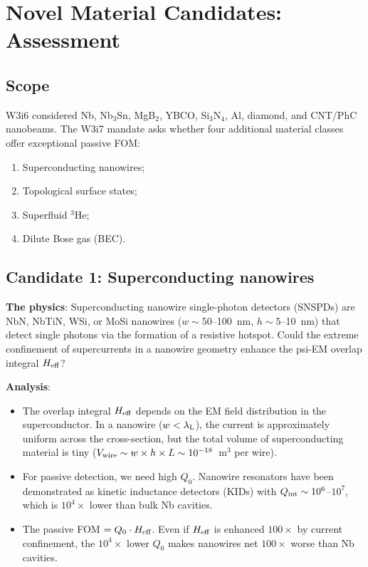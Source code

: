 \documentclass[11pt]{article}
\theoremstyle{definition}
\theoremstyle{remark}
\newcommand{\lambdaL}{\lambda_{\rm L}}
\newcommand{\Heff}{H_{\rm eff}}
\begin{document}
\section{Novel Material Candidates: Assessment}
\label{sec:novel}

\subsection{Scope}

W3i6 considered Nb, Nb$_3$Sn, MgB$_2$, YBCO, Si$_3$N$_4$, Al, diamond,
and CNT/PhC nanobeams. The W3i7 mandate asks whether four additional
material classes offer exceptional passive FOM:
\begin{enumerate}[nosep]
  \item Superconducting nanowires;
  \item Topological surface states;
  \item Superfluid $^3$He;
  \item Dilute Bose gas (BEC).
\end{enumerate}

\subsection{Candidate 1: Superconducting nanowires}
\label{sec:nanowires}

\textbf{The physics}: Superconducting nanowire single-photon detectors
(SNSPDs) are NbN, NbTiN, WSi, or MoSi nanowires ($w \sim 50$--100~nm,
$h \sim 5$--10~nm) that detect single photons via the formation of a
resistive hotspot. Could the extreme confinement of supercurrents in a
nanowire geometry enhance the psi-EM overlap integral $\Heff$?

\textbf{Analysis}:
\begin{itemize}[nosep]
  \item The overlap integral $\Heff$ depends on the EM field distribution
    in the superconductor. In a nanowire ($w < \lambdaL$), the
    current is approximately uniform across the cross-section, but the
    total volume of superconducting material is tiny
    ($V_{\rm wire} \sim w \times h \times L \sim 10^{-18}$~m$^3$ per wire).
  \item For passive detection, we need high $Q_0$. Nanowire resonators
    have been demonstrated as kinetic inductance detectors (KIDs) with
    $Q_{\rm int} \sim 10^6$--$10^7$, which is $10^4\times$ lower than
    bulk Nb cavities.
  \item The passive FOM $= Q_0 \cdot \Heff$. Even if $\Heff$ is
    enhanced $100\times$ by current confinement, the $10^4\times$
    lower $Q_0$ makes nanowires net $100\times$ worse than Nb cavities.
\end{itemize}
\end{document}

